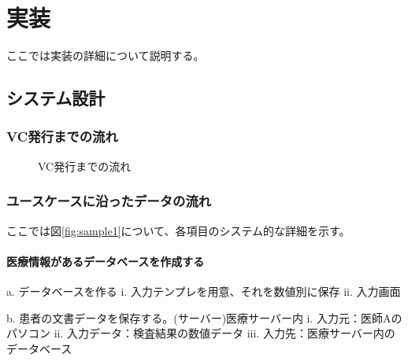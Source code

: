 \chapter{実装}
\label{chap:implementation}

ここでは実装の詳細について説明する。


\section{システム設計}
\subsection{VC発行までの流れ}

\begin{figure}[htbp]
    \begin{center}
    \end{center}
    \caption{VC発行までの流れ}
    \label{fig:sample3}
\end{figure}


\subsection{ユースケースに沿ったデータの流れ}

ここでは図\ref{fig:sample1}について、各項目のシステム的な詳細を示す。

\subsubsection{医療情報があるデータベースを作成する}
a.	データベースを作る 
i.	入力テンプレを用意、それを数値別に保存 
ii.	入力画面 
 
 
b.	患者の文書データを保存する。(サーバー)医療サーバー内 
i.	入力元：医師Aのパソコン 
ii.	入力データ：検査結果の数値データ 
iii.	入力先：医療サーバー内のデータベース 
 
